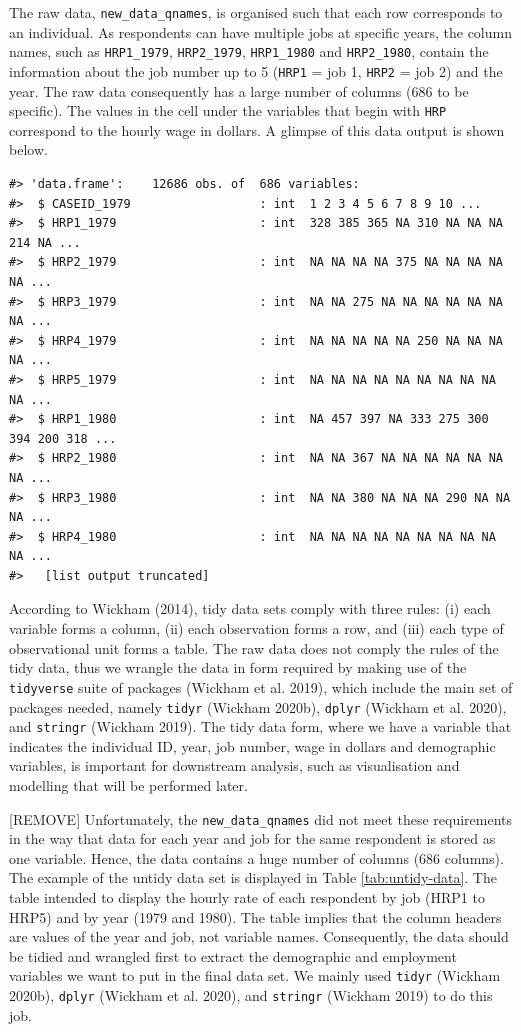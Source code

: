 \documentclass{article}
\begin{document}
The raw data, \texttt{new\_data\_qnames}, is organised such that each row corresponds to an individual. As respondents can have multiple jobs at specific years, the column names, such as \texttt{HRP1\_1979}, \texttt{HRP2\_1979}, \texttt{HRP1\_1980} and \texttt{HRP2\_1980}, contain the information about the job number up to 5 (\texttt{HRP1} = job 1, \texttt{HRP2} = job 2) and the year. The raw data consequently has a large number of columns (686 to be specific). The values in the cell under the variables that begin with \texttt{HRP} correspond to the hourly wage in dollars. A glimpse of this data output is shown below.

\begin{verbatim}
#> 'data.frame':    12686 obs. of  686 variables:
#>  $ CASEID_1979                  : int  1 2 3 4 5 6 7 8 9 10 ...
#>  $ HRP1_1979                    : int  328 385 365 NA 310 NA NA NA 214 NA ...
#>  $ HRP2_1979                    : int  NA NA NA NA 375 NA NA NA NA NA ...
#>  $ HRP3_1979                    : int  NA NA 275 NA NA NA NA NA NA NA ...
#>  $ HRP4_1979                    : int  NA NA NA NA NA 250 NA NA NA NA ...
#>  $ HRP5_1979                    : int  NA NA NA NA NA NA NA NA NA NA ...
#>  $ HRP1_1980                    : int  NA 457 397 NA 333 275 300 394 200 318 ...
#>  $ HRP2_1980                    : int  NA NA 367 NA NA NA NA NA NA NA ...
#>  $ HRP3_1980                    : int  NA NA 380 NA NA NA 290 NA NA NA ...
#>  $ HRP4_1980                    : int  NA NA NA NA NA NA NA NA NA NA ...
#>   [list output truncated]
\end{verbatim}

According to Wickham (2014), tidy data sets comply with three rules: (i) each variable forms a column, (ii) each observation forms a row, and (iii) each type of observational unit forms a table. The raw data does not comply the rules of the tidy data, thus we wrangle the data in form required by making use of the \texttt{tidyverse} suite of packages (Wickham et al. 2019), which include the main set of packages needed, namely \texttt{tidyr} (Wickham 2020b), \texttt{dplyr} (Wickham et al. 2020), and \texttt{stringr} (Wickham 2019). The tidy data form, where we have a variable that indicates the individual ID, year, job number, wage in dollars and demographic variables, is important for downstream analysis, such as visualisation and modelling that will be performed later.

{[}REMOVE{]} Unfortunately, the \texttt{new\_data\_qnames} did not meet these requirements in the way that data for each year and job for the same respondent is stored as one variable. Hence, the data contains a huge number of columns (686 columns). The example of the untidy data set is displayed in Table \ref{tab:untidy-data}. The table intended to display the hourly rate of each respondent by job (HRP1 to HRP5) and by year (1979 and 1980). The table implies that the column headers are values of the year and job, not variable names. Consequently, the data should be tidied and wrangled first to extract the demographic and employment variables we want to put in the final data set. We mainly used \texttt{tidyr} (Wickham 2020b), \texttt{dplyr} (Wickham et al. 2020), and \texttt{stringr} (Wickham 2019) to do this job.
\end{document}
